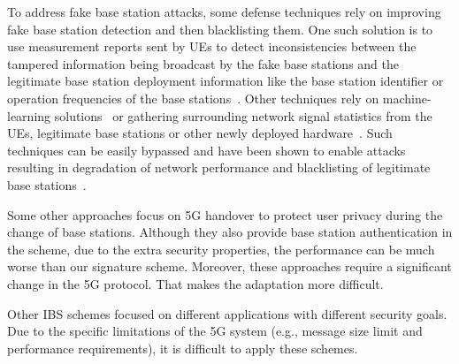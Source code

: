 To address fake base station attacks, some defense techniques rely on improving fake base station detection and then blacklisting them. One such solution is to use measurement reports sent by UEs to detect inconsistencies between the tampered information being broadcast by the fake base stations and the legitimate base station deployment information like the base station identifier or operation frequencies of the base stations~\cite{3GPP:33.501}. Other techniques rely on machine-learning solutions~\cite{jin2019rogue, van2015detecting, engelstad2016strengthening} or  gathering surrounding network signal statistics from the UEs, legitimate base stations or other newly deployed hardware~\cite{dabrowski2014imsi, steig2016network, alrashede2019imsi, dabrowski2016messenger, li2017fbs}. Such techniques can be easily bypassed and have been shown to enable attacks resulting in degradation of network performance and blacklisting of legitimate base stations~\cite{shaik2018impact}. 

Some other approaches \cite{fan2019rehand, alnashwan2023privacy, 10.1145/3658644.3690331} focus on 5G handover to protect user privacy during the change of base stations. Although they also provide base station authentication in the scheme, due to the extra security properties, the performance can be much worse than our signature scheme. Moreover, these approaches require a significant change in the 5G protocol. That makes the adaptation more difficult.

Other IBS schemes \cite{meshram2021iboost, zhang2023identity, au2013realizing} focused on different applications with different security goals. Due to the specific limitations of the 5G system (e.g., message size limit and performance requirements), it is difficult to apply these schemes.